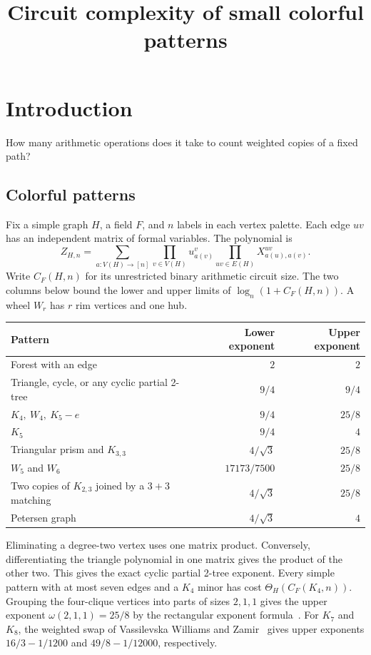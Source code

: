 \documentclass[11pt,letterpaper]{article}
\title{Circuit complexity of small colorful patterns}
\author{}
\begin{document}
\maketitle
\section{Introduction}
How many arithmetic operations does it take to count weighted copies of a fixed path?

\subsection{Colorful patterns}
Fix a simple graph \(H\), a field \(F\), and \(n\) labels in each vertex palette.
Each edge \(uv\) has an independent matrix of formal variables. The polynomial is
\[
 Z_{H,n}=\sum_{a:V(H)\to[n]} \prod_{v\in V(H)} u^v_{a(v)}
                        \prod_{uv\in E(H)} X^{uv}_{a(u),a(v)} .
\]
Write \(C_F(H,n)\) for its unrestricted binary arithmetic circuit size.
The two columns below bound the lower and upper limits of \(\log_n(1+C_F(H,n))\).
A wheel \(W_r\) has \(r\) rim vertices and one hub.

\begin{center}
\begin{tabularx}{\linewidth}{@{}Xrr@{}}
\toprule Pattern & Lower exponent & Upper exponent\\ \midrule
Forest with an edge & \(2\) & \(2\)\\
Triangle, cycle, or any cyclic partial 2-tree & \(9/4\) & \(9/4\)\\
\(K_4,\ W_4,\ K_5-e\) & \(9/4\) & \(25/8\)\\
\(K_5\) & \(9/4\) & \(4\)\\
Triangular prism and \(K_{3,3}\) & \(4/\sqrt3\) & \(25/8\)\\
\(W_5\) and \(W_6\) & \(17173/7500\) & \(25/8\)\\
Two copies of \(K_{2,3}\) joined by a $3+3$ matching & \(4/\sqrt3\) & \(25/8\)\\
Petersen graph & \(4/\sqrt3\) & \(4\)\\ \bottomrule
\end{tabularx}
\end{center}

Eliminating a degree-two vertex uses one matrix product. Conversely,
differentiating the triangle polynomial in one matrix gives the product of the other two.
This gives the exact cyclic partial 2-tree exponent. Every simple pattern with at most
seven edges and a \(K_4\) minor has cost \(\Theta_H(C_F(K_4,n))\).
Grouping the four-clique vertices into parts of sizes \(2,1,1\) gives
the upper exponent \(\omega(2,1,1)=25/8\) by the rectangular exponent formula~\cite{matrix-exponent}.
For \(K_7\) and \(K_8\), the weighted swap of Vassilevska Williams and Zamir~\cite[Section~3]{vw-zamir}
gives upper exponents \(16/3-1/1200\) and \(49/8-1/12000\), respectively.
\end{document}
